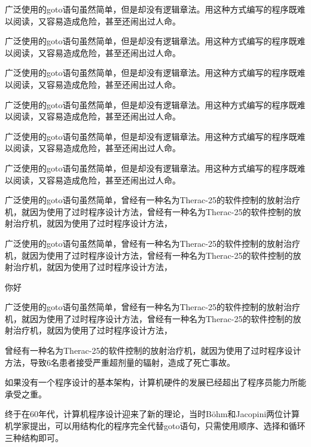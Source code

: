 \documentclass[custom]{linearbook}
\begin{document}
\lbline

\begin{example}
  广泛使用的goto语句虽然简单，但是却没有逻辑章法。用这种方式编写的程序既难以阅读，又容易造成危险，甚至还闹出过人命。

  \sj 广泛使用的goto语句虽然简单，但是却没有逻辑章法。用这种方式编写的程序既难以阅读，又容易造成危险，甚至还闹出过人命。
\end{example}
\begin{definition}
  广泛使用的goto语句虽然简单，但是却没有逻辑章法。用这种方式编写的程序既难以阅读，又容易造成危险，甚至还闹出过人命。
\end{definition}
\begin{lemma}
  广泛使用的goto语句虽然简单，但是却没有逻辑章法。用这种方式编写的程序既难以阅读，又容易造成危险，甚至还闹出过人命。
\end{lemma}
\begin{remark}
  广泛使用的goto语句虽然简单，但是却没有逻辑章法。用这种方式编写的程序既难以阅读，又容易造成危险，甚至还闹出过人命。

  广泛使用的goto语句虽然简单，但是却没有逻辑章法。用这种方式编写的程序既难以阅读，又容易造成危险，甚至还闹出过人命。
\end{remark}
\begin{solution}
  广泛使用的goto语句虽然简单，曾经有一种名为Therac-25的软件控制的放射治疗机，就因为使用了过时程序设计方法，曾经有一种名为Therac-25的软件控制的放射治疗机，就因为使用了过时程序设计方法，

  广泛使用的goto语句虽然简单，曾经有一种名为Therac-25的软件控制的放射治疗机，就因为使用了过时程序设计方法，曾经有一种名为Therac-25的软件控制的放射治疗机，就因为使用了过时程序设计方法，
\end{solution}

你好

\begin{solution}[证明]
  广泛使用的goto语句虽然简单，曾经有一种名为Therac-25的软件控制的放射治疗机，就因为使用了过时程序设计方法，曾经有一种名为Therac-25的软件控制的放射治疗机，就因为使用了过时程序设计方法，
\end{solution}

曾经有一种名为Therac-25的软件控制的放射治疗机，就因为使用了过时程序设计方法，导致6名患者接受严重超剂量的辐射，造成了死亡事故。

如果没有一个程序设计的基本架构，计算机硬件的发展已经超出了程序员能力所能承受之重。

终于在60年代，计算机程序设计迎来了新的理论，当时Böhm和Jacopini两位计算机学家提出，可以用结构化的程序完全代替goto语句，只需使用顺序、选择和循环三种结构即可。
\end{document}
